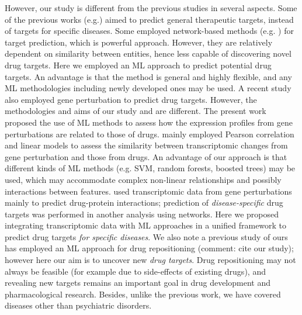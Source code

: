     However, our study is different from the previous studies in several aspects. Some of the previous works (e.g.\cite {ferrero2017silico, bakheet2009properties, kumari2015identification, li2007prediction}) aimed to predict general therapeutic targets, instead of targets for specific diseases. Some employed network-based methods (e.g. \cite{sawada2018predicting, li2015large, emig2013drug}) for target prediction, which is powerful approach. However, they are relatively dependent on similarity between entities, hence less capable of discovering novel drug targets. Here we employed an ML approach to predict potential drug targets. An advantage is that the method is general and highly flexible, and any ML methodologies including newly developed ones may be used. A recent study  \cite{sawada2018predicting} also employed gene perturbation to predict drug targets. However, the methodologies and aims of our study and \cite{sawada2018predicting} are different. The present work proposed the use of ML methods to assess how the expression profiles from gene perturbations are related to those of drugs. \cite{sawada2018predicting} mainly employed Pearson correlation and linear models to assess the similarity between transcriptomic changes from gene perturbation and those from drugs. An advantage of our approach is that different kinds of ML methods (e.g. SVM, random forests, boosted trees) may be used, which may accommodate complex non-linear relationships and possibly interactions between features.  \cite {sawada2018predicting} used transcriptomic data from gene perturbations mainly to predict drug-protein interactions; prediction of \textit{disease-specific} drug targets was performed in another analysis using networks. Here we proposed integrating transcriptomic data with ML approaches in a unified framework to predict drug targets\textit{}\textit{ for specific diseases}. We also note a previous study of ours has employed an ML approach for drug repositioning (comment: cite our study); however here our aim is to uncover new \textit{drug targets}. Drug repositioning may not always be feasible (for example due to side-effects of existing drugs), and revealing new targets remains an important goal in drug development and pharmacological research.  Besides, unlike the previous work, we have covered diseases other than psychiatric disorders. 
    
